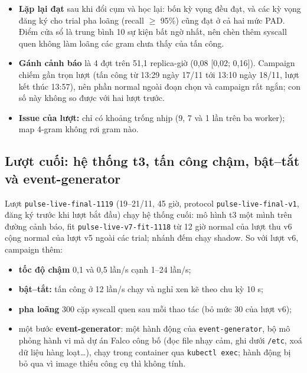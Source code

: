 \begin{itemize}
\tightlist
\item
  \textbf{Lặp lại đạt} sau khi đổi cụm và học lại: bốn kỳ vọng đều đạt, và các kỳ vọng đăng ký cho trial pha loãng (recall $\geq$ 95\%) cũng đạt ở cả hai mức PAD. Điểm cửa sổ là trung bình 10 sự kiện bất ngờ nhất, nên chèn thêm syscall quen không làm loãng các gram chưa thấy của tấn công.
\item
  \textbf{Gánh cảnh báo} là 4 đợt trên 51,1 replica-giờ (0,08 {[}0,02; 0,16{]}). Campaign chiếm gần trọn lượt (tấn công từ 13:29 ngày 17/11 tới 13:10 ngày 18/11, lượt kết thúc 13:57), nên phần normal ngoài đoạn chọn và campaign rất ngắn; con số này không so được với hai lượt trước.
\item
  \textbf{Issue của lượt:} chỉ có khoảng trống nhịp (9, 7 và 1 lần trên ba worker); map 4-gram không rơi gram nào.
\end{itemize}

\subsection{Lượt cuối: hệ thống t3, tấn công chậm, bật--tắt và event-generator}\label{sec:token-live-final}

Lượt \texttt{pulse-\allowbreak{}live-\allowbreak{}final-\allowbreak{}1119} (19--21/11, 45 giờ, protocol \texttt{pulse-\allowbreak{}live-\allowbreak{}final-\allowbreak{}v1}, đăng ký trước khi lượt bắt đầu) chạy hệ thống cuối: mô hình t3 một mình trên đường cảnh báo, fit \texttt{pulse-\allowbreak{}live-\allowbreak{}v7-\allowbreak{}fit-\allowbreak{}1118} từ 12 giờ normal của lượt thu v6 cộng normal của lượt v5 ngoài các trial; nhánh đếm chạy shadow. So với lượt v6, campaign thêm:

\begin{itemize}
\tightlist
\item
  \textbf{tốc độ chậm} 0,1 và 0,5 lần/s cạnh 1--24 lần/s;
\item
  \textbf{bật--tắt:} tấn công ở 12 lần/s chạy và nghỉ xen kẽ theo chu kỳ 10 s;
\item
  \textbf{pha loãng} 300 cặp syscall quen sau mỗi thao tác (bỏ mức 30 của lượt v6);
\item
  một bước \textbf{event-generator}: một hành động của \texttt{event-\allowbreak{}generator}, bộ mô phỏng hành vi mà dự án Falco công bố (đọc file nhạy cảm, ghi dưới \texttt{/etc}, xoá dữ liệu hàng loạt\ldots), chạy trong container qua \texttt{kubectl exec}; hành động bị bỏ qua vì image thiếu công cụ thì không tính.
\end{itemize}

